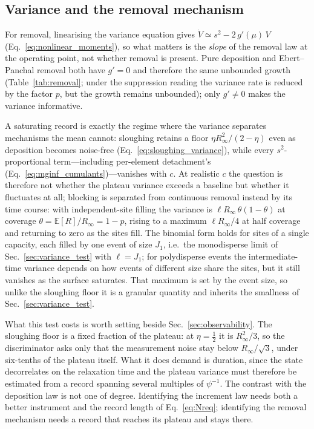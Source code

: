 \documentclass[preprint,12pt]{elsarticle}
\begin{document}
\subsection{Variance and the removal mechanism}
\label{sec:variance_removal}

For removal, linearising the variance equation gives
$\dot V\simeq s^2-2\,g'(\mu)\,V$ (Eq.~\eqref{eq:nonlinear_moments}), so what
matters is the \emph{slope} of the removal law at the operating point, not
whether removal is present. Pure deposition and Ebert--Panchal removal both
have $g'=0$ and therefore the same unbounded growth
(Table~\ref{tab:removal}; under the suppression reading the variance rate
is reduced by the factor $p$, but the growth remains unbounded); only
$g'\neq0$ makes the variance informative.

A saturating record is exactly the regime where the variance separates
mechanisms the mean cannot: sloughing retains a floor
$\eta R_\infty^2/(2-\eta)$ even as deposition becomes noise-free
(Eq.~\eqref{eq:sloughing_variance}), while every $s^2$-proportional term---including
per-element detachment's (Eq.~\eqref{eq:mginf_cumulants})---vanishes with $c$. At realistic $c$
the question is therefore not whether the plateau variance exceeds a baseline but whether it
fluctuates at all; blocking is separated from continuous removal
instead by its time course: with independent-site filling the variance is
$\ell R_\infty\,\theta(1-\theta)$ at coverage
$\theta=\mathbb E[R]/R_\infty=1-p$, rising to a maximum $\ell R_\infty/4$
at half coverage and returning to zero as the sites fill. The binomial
form holds for sites of a single capacity, each filled by one event of size
$J_1$, i.e.\ the monodisperse limit of Sec.~\ref{sec:variance_test} with
$\ell=J_1$; for polydisperse events the intermediate-time variance depends on
how events of different size share the sites, but it still vanishes as the
surface saturates. That maximum is set
by the event size, so unlike the sloughing floor it is a granular quantity and
inherits the smallness of Sec.~\ref{sec:variance_test}.

What this test costs is worth setting beside
Sec.~\ref{sec:observability}. The sloughing floor is a fixed fraction of the
plateau: at $\eta=\tfrac12$ it is $R_\infty^2/3$, so the discriminator asks
only that the measurement noise stay below $R_\infty/\sqrt3$, under
six-tenths of the plateau itself. What it does demand is duration, since the
state decorrelates on the relaxation time and the plateau variance must
therefore be estimated from a record spanning several multiples of
$\psi^{-1}$. The contrast with the deposition law is not one of degree.
Identifying the increment law needs both a better instrument and the record
length of Eq.~\eqref{eq:Nreq}; identifying the removal mechanism needs a
record that reaches its plateau and stays there.
\end{document}
